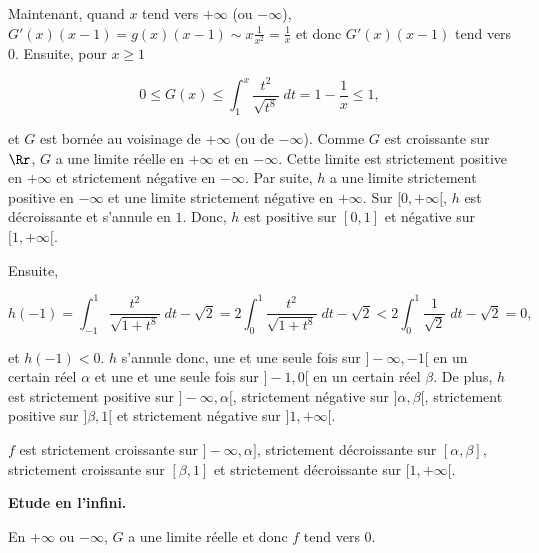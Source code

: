 {{Maintenant, quand $x$ tend vers $+\infty$ (ou $-\infty$), $G'(x)(x-1)=g(x)(x-1)\sim x\frac{1}{x^2}=\frac{1}{x}$ et donc $G'(x)(x-1)$ tend vers $0$. Ensuite, pour $x\geq1$

$$0\leq G(x)\leq\int_{1}^{x}\frac{t^2}{\sqrt{t^8}}\;dt=1-\frac{1}{x}\leq1,$$

et $G$ est bornée au voisinage de $+\infty$ (ou de $-\infty$). Comme $G$ est croissante sur $\Rr$, $G$ a une limite réelle en $+\infty$ et en $-\infty$. Cette limite est strictement positive en $+\infty$ et strictement négative en $-\infty$. Par suite, $h$ a une limite strictement positive en $-\infty$ et une limite strictement négative en $+\infty$.
Sur $[0,+\infty[$, $h$ est décroissante et s'annule en $1$. Donc, $h$ est positive sur $[0,1]$ et négative sur $[1,+\infty[$.

Ensuite, 

$$h(-1)=\int_{-1}^{1}\frac{t^2}{\sqrt{1+t^8}}\;dt-\sqrt{2}=2\int_{0}^{1}\frac{t^2}{\sqrt{1+t^8}}\;dt-\sqrt{2}<2\int_{0}^{1}\frac{1}{\sqrt{2}}\;dt-\sqrt{2}=0,$$

et $h(-1)<0$. $h$ s'annule donc, une et une seule fois sur $]-\infty,-1[$ en un certain réel $\alpha$ et une et une seule fois sur $]-1,0[$ en un certain réel $\beta$. De plus, $h$ est strictement positive sur $]-\infty,\alpha[$, strictement négative sur $]\alpha,\beta[$, strictement positive sur $]\beta,1[$ et strictement négative sur $]1,+\infty[$.

$f$ est strictement croissante sur $]-\infty,\alpha]$, strictement décroissante sur $[\alpha,\beta]$, strictement croissante sur $[\beta,1]$ et strictement décroissante sur $[1,+\infty[$.

\textbf{Etude en l'infini.}

En $+\infty$ ou $-\infty$, $G$ a une limite réelle et donc $f$ tend vers $0$.
}
}
